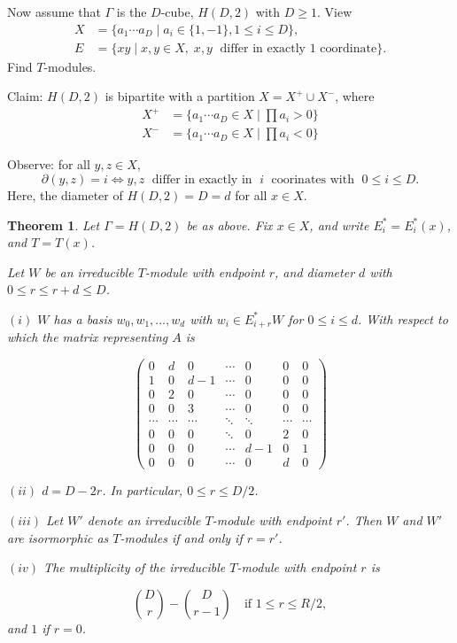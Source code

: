 \documentclass[
]{book}
\newtheorem{theorem}{Theorem}[chapter]
\theoremstyle{definition}
\theoremstyle{definition}
\theoremstyle{definition}
\theoremstyle{definition}
\theoremstyle{remark}
\begin{document}
Now assume that \(\Gamma\) is the \(D\)-cube, \(H(D,2)\) with \(D\geq 1\). View
\begin{align}
X & = \{a_1\cdots a_D\mid a_i\in \{1, -1\}, 1\leq i\leq D\},\\
E & = \{xy\mid x, y\in X, \; x, y \;\text{ differ in exactly 1 coordinate}\}.
\end{align}
Find \(T\)-modules.

Claim: \(H(D,2)\) is bipartite with a partition \(X = X^+ \cup X^-\), where
\begin{align}
X^+ & = \{a_1\cdots a_D\in X\mid \prod a_i > 0\}\\
X^- & = \{a_1\cdots a_D \in X \mid \prod a_i < 0\}
\end{align}

Observe: for all \(y, z\in X\),
\[\partial(y,z) = i \Leftrightarrow y, z \; \text{ differ in exactly in }\; i\; \text{ coorinates with }\; 0\leq i\leq D.\]
Here, the diameter of \(H(D, 2) = D = d\) for all \(x\in X\).

\begin{theorem}
\protect\hypertarget{thm:hd2-modules}{}\label{thm:hd2-modules}Let \(\Gamma = H(D,2)\) be as above. Fix \(x\in X\), and write \(E_i^* = E^*_i(x)\), and \(T = T(x)\).

Let \(W\) be an irreducible \(T\)-module with endpoint \(r\), and diameter \(d\) with \(0\leq r \leq r+d\leq D\).

\((i)\) \(W\) has a basis \(w_0, w_1, \ldots, w_d\) with \(w_i\in E^*_{i+r}W\) for \(0\leq i\leq d\). With respect to which the matrix representing \(A\) is

\[
\begin{pmatrix}
0 & d & 0 & \cdots & 0 & 0 & 0\\
1 & 0 & d-1 & \cdots & 0 & 0 & 0\\
0 & 2 & 0 & \cdots & 0 & 0 & 0\\
0 & 0 & 3 & \cdots & 0 & 0 & 0\\
\cdots & \cdots & \cdots & \ddots & \ddots & \cdots & \cdots \\
0 & 0 & 0 & \ddots & 0 & 2 & 0\\
0 & 0 & 0 & \cdots & d-1 & 0 & 1\\
0 & 0 & 0 & \cdots & 0 & d & 0
\end{pmatrix}
\]

\((ii)\) \(d= D-2r\). In particular, \(0\leq r\leq D/2\).

\((iii)\) Let \(W'\) denote an irreducible \(T\)-module with endpoint \(r'\). Then \(W\) and \(W'\) are isormorphic as \(T\)-modules if and only if \(r = r'\).

\((iv)\) The multiplicity of the irreducible \(T\)-module with endpoint \(r\) is

\[\binom{D}{r} - \binom{D}{r-1} \quad \text{if } 1\leq r \leq R/2,\]
and \(1\) if \(r = 0\).
\end{theorem}
\end{document}
